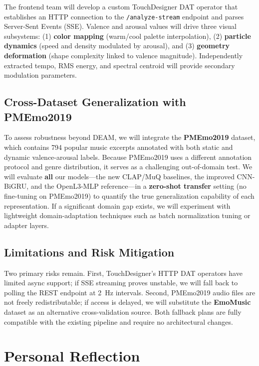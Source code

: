 \documentclass[12pt,a4paper]{article}
\begin{document}
The frontend team will develop a custom TouchDesigner DAT operator that establishes an HTTP connection to the \texttt{/analyze-stream} endpoint and parses Server-Sent Events (SSE). Valence and arousal values will drive three visual subsystems: (1) \textbf{color mapping} (warm/cool palette interpolation), (2) \textbf{particle dynamics} (speed and density modulated by arousal), and (3) \textbf{geometry deformation} (shape complexity linked to valence magnitude). Independently extracted tempo, RMS energy, and spectral centroid will provide secondary modulation parameters.

\subsection{Cross-Dataset Generalization with PMEmo2019}

To assess robustness beyond DEAM, we will integrate the \textbf{PMEmo2019} dataset, which contains 794 popular music excerpts annotated with both static and dynamic valence-arousal labels. Because PMEmo2019 uses a different annotation protocol and genre distribution, it serves as a challenging out-of-domain test. We will evaluate \textbf{all} our models---the new CLAP/MuQ baselines, the improved CNN-BiGRU, and the OpenL3-MLP reference---in a \textbf{zero-shot transfer} setting (no fine-tuning on PMEmo2019) to quantify the true generalization capability of each representation. If a significant domain gap exists, we will experiment with lightweight domain-adaptation techniques such as batch normalization tuning or adapter layers.

\subsection{Limitations and Risk Mitigation}

Two primary risks remain. First, TouchDesigner's HTTP DAT operators have limited async support; if SSE streaming proves unstable, we will fall back to polling the REST endpoint at 2~Hz intervals. Second, PMEmo2019 audio files are not freely redistributable; if access is delayed, we will substitute the \textbf{EmoMusic} dataset as an alternative cross-validation source. Both fallback plans are fully compatible with the existing pipeline and require no architectural changes.

\section{Personal Reflection}
\end{document}

